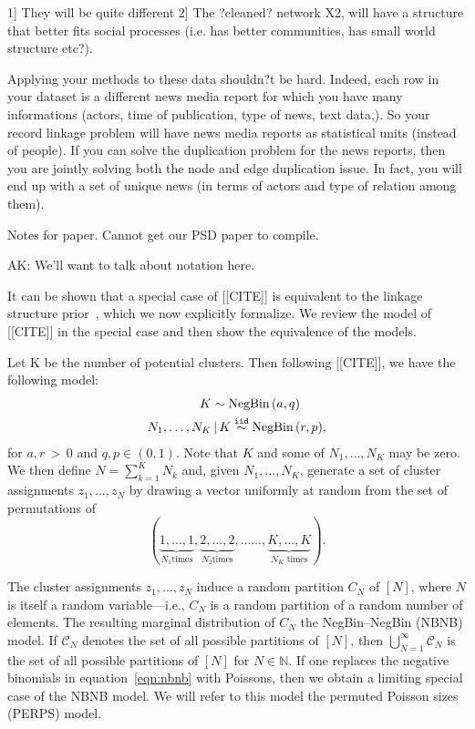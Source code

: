 \documentclass[twoside]{article}
\newcommand{\g}{\,|\,}
\begin{document}
1] They will be quite different
2] The ?cleaned? network X2, will have a structure that better fits social processes (i.e. has better communities, has small world structure etc?).

Applying your methods to these data shouldn?t be hard. Indeed, each row in your dataset is a different news media report for which you have many informations (actors, time of publication, type of news, text data,). So your record linkage problem will have news media reports as statistical units (instead of people). If you can solve the duplication problem for the news reports, then you are jointly solving both the node and edge duplication issue. In fact, you will end up with a set of unique news (in terms of actors and type of relation among them).

\newpage

Notes for paper. Cannot get our PSD paper to compile. 

AK: We'll want to talk about notation here. 

It can be shown that a special case of [[CITE]] is equivalent to the linkage structure
prior~\cite{steorts14smered,steorts??bayesian}, which we now explicitly formalize. 
We review the model of [[CITE]] in the special case and then show the equivalence of 
the models. 

Let K be the number of potential clusters. Then following [[CITE]], we have the following 
model: 
\begin{align}
  K &\sim \textrm{NegBin}\,(a, q) \nonumber \\
 N_1, \ldots, N_K &\g K \iid \textrm{NegBin}\,(r, p),
  \label{eqn:nbnb}
\end{align}
for $a, r \,>\, 0$ and $q, p \in (0, 1)$. Note that $K$ and some of
$N_1, \ldots, N_K$ may be zero. We then define $N = \sum_{k=1}^K N_k$
and, given $N_1, \ldots, N_K$, generate a set of cluster assignments
$z_1, \ldots, z_N$ by drawing a vector uniformly at random from the
set of permutations of $$(\underbrace{1,\ldots,1}_\text{$N_1$
  times},\underbrace{2,\ldots,2}_\text{$N_2$
  times},\ldots\ldots,\underbrace{K,\ldots,K}_\text{$N_K$ times}).$$

The cluster assignments $z_1, \ldots, z_N$ induce a random partition
$C_N$ of $[N]$, where $N$ is itself a random variable---i.e., $C_N$ is
a random partition of a random number of elements. The resulting marginal distribution of $C_N$ the NegBin--NegBin (NBNB)
model. If $\mathscr{C}_N$ denotes the set of all possible partitions
of $[N]$, then $\bigcup_{N=1}^{\infty} \mathscr{C}_N$ is the set of
all possible partitions of $[N]$ for $N \in \mathbb{N}$. If one replaces the 
 negative binomials in equation~\ref{eqn:nbnb} with Poissons, then
we obtain a limiting special case of the NBNB model. We will refer to this
model the permuted Poisson sizes (PERPS) model.
\end{document}
